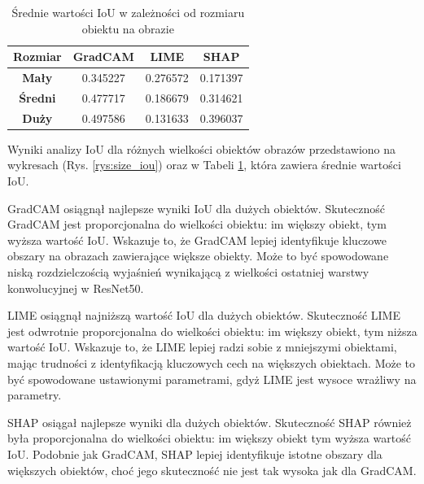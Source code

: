 \begin{table}[h]
	\centering
	\begin{tabular}{|c|c|c|c|}
		\hline
		\textbf{Rozmiar} & \textbf{GradCAM} & \textbf{LIME} & \textbf{SHAP} \\
		\hline
		\textbf{Mały}    & 0.345227         & 0.276572      & 0.171397      \\
		\hline
		\textbf{Średni}  & 0.477717         & 0.186679      & 0.314621      \\
		\hline
		\textbf{Duży}    & 0.497586         & 0.131633      & 0.396037      \\
		\hline
	\end{tabular}
	\caption{Średnie wartości IoU w zależności od rozmiaru obiektu na obrazie}
	\label{tab:size_iou}
\end{table}

Wyniki analizy IoU dla różnych wielkości obiektów obrazów przedstawiono na wykresach (Rys. \ref{rys:size_iou}) oraz w Tabeli \ref{tab:size_iou}, która zawiera średnie wartości IoU.

GradCAM osiągnął najlepsze wyniki IoU dla dużych obiektów.
Skuteczność GradCAM jest proporcjonalna do wielkości obiektu: im większy obiekt, tym wyższa wartość IoU.
Wskazuje to, że GradCAM lepiej identyfikuje kluczowe obszary na obrazach zawierające większe obiekty.
Może to być spowodowane niską rozdzielczością wyjaśnień wynikającą z wielkości ostatniej warstwy konwolucyjnej w ResNet50.

LIME osiągnął najniższą wartość IoU dla dużych obiektów.
Skuteczność LIME jest odwrotnie proporcjonalna do wielkości obiektu:  im większy obiekt, tym niższa wartość IoU.
Wskazuje to, że LIME lepiej radzi sobie z mniejszymi obiektami, mając trudności z identyfikacją kluczowych cech na większych obiektach.
Może to być spowodowane ustawionymi parametrami, gdyż LIME jest wysoce wrażliwy na parametry.

SHAP osiągał najlepsze wyniki dla dużych obiektów.
Skuteczność SHAP również była proporcjonalna do wielkości obiektu: im większy obiekt tym wyższa wartość IoU.
Podobnie jak GradCAM, SHAP lepiej identyfikuje istotne obszary dla większych obiektów, choć jego skuteczność nie jest tak wysoka jak dla GradCAM.

